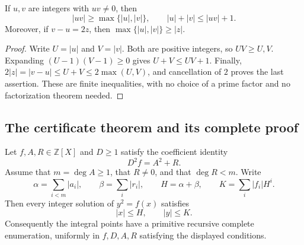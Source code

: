 \begin{lemma}
\label{lem:runge-product-bound}
If $u,v$ are integers with $uv\neq0$, then
\[
 |uv|\geq\max\{|u|,|v|\},\qquad
 |u|+|v|\leq |uv|+1.
\]
Moreover, if $v-u=2z$, then $\max\{|u|,|v|\}\geq |z|$.
\end{lemma}
\begin{proof}
Write $U=|u|$ and $V=|v|$.  Both are positive integers, so $UV\geq U,V$.
Expanding $(U-1)(V-1)\geq0$ gives $U+V\leq UV+1$.
Finally,
$2|z|=|v-u|\leq U+V\leq2\max(U,V)$, and cancellation of $2$ proves the
last assertion.  These are finite inequalities, with no choice of a prime
factor and no factorization theorem needed.
\end{proof}

\subsection{The certificate theorem and its complete proof}

\begin{theorem}
\label{thm:runge-certificate}
Let $f,A,R\in\mathbb Z[X]$ and $D\geq1$ satisfy the coefficient identity
\[
                 D^2 f=A^2+R.
\tag{RC}
\]
Assume that $m=\deg A\geq1$, that $R\neq0$, and that $\deg R<m$.
Write
\[
 \alpha=\sum_{i<m}|a_i|,\qquad
 \beta=\sum_i|r_i|,\qquad H=\alpha+\beta,
 \qquad K=\sum_i|f_i|H^i.
\]
Then every integer solution of $y^2=f(x)$ satisfies
\[
                         |x|\leq H,
                    \qquad |y|\leq K.
\]
Consequently the integral points have a primitive recursive complete
enumeration, uniformly in $f,D,A,R$ satisfying the displayed conditions.
\end{theorem}


